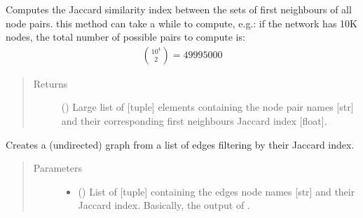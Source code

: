 \documentclass[letterpaper,10pt,english]{sphinxmanual}
\begin{document}
\begin{fulllineitems}
\begin{fulllineitems}
\end{fulllineitems}


\begin{fulllineitems}
\label{\detokenize{main:pypath.main.PyPath.jaccard_edges}}
Computes the Jaccard similarity index between the sets of first
neighbours of all node pairs.  this method can take a
while to compute, e.g.: if the network has 10K nodes, the total
number of possible pairs to compute is:
\begin{equation*}
\begin{split}\binom{10^4}{2} = 49995000\end{split}
\end{equation*}\begin{quote}\begin{description}
\item[{Returns}] \leavevmode
() \textendash{} Large list of {[}tuple{]} elements containing the
node pair names {[}str{]} and their corresponding first
neighbours Jaccard index {[}float{]}.

\end{description}\end{quote}

\end{fulllineitems}


\begin{fulllineitems}
\label{\detokenize{main:pypath.main.PyPath.jaccard_meta}}
Creates a (undirected) graph from a list of edges filtering by
their Jaccard index.
\begin{quote}\begin{description}
\item[{Parameters}] \leavevmode\begin{itemize}
\item {} 
 () \textendash{} List of {[}tuple{]} containing the edges node names {[}str{]} and
their Jaccard index. Basically, the output of
{\hyperref[\detokenize{main:pypath.main.PyPath.jaccard_edges}]{}}.


\end{itemize}
\end{description}
\end{quote}
\end{fulllineitems}
\end{fulllineitems}
\end{document}
